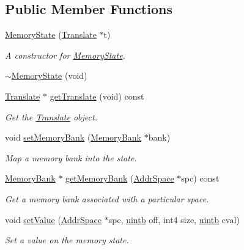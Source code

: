 \subsection*{Public Member Functions}
\begin{DoxyCompactItemize}
\item 
\mbox{\hyperlink{class_memory_state_a99b4d8fc22d89ffdcaaef799ffaf7909}{Memory\+State}} (\mbox{\hyperlink{class_translate}{Translate}} $\ast$t)
\begin{DoxyCompactList}\small\item\em A constructor for \mbox{\hyperlink{class_memory_state}{Memory\+State}}. \end{DoxyCompactList}\item 
\mbox{\hyperlink{class_memory_state_abaeb9c50eb22aa5110edb57461be41c3}{$\sim$\+Memory\+State}} (void)
\item 
\mbox{\hyperlink{class_translate}{Translate}} $\ast$ \mbox{\hyperlink{class_memory_state_aefbe63d695c36756cbc16d09bea76677}{get\+Translate}} (void) const
\begin{DoxyCompactList}\small\item\em Get the \mbox{\hyperlink{class_translate}{Translate}} object. \end{DoxyCompactList}\item 
void \mbox{\hyperlink{class_memory_state_ad1c31dbc7de2dfb6926537c7f9166e92}{set\+Memory\+Bank}} (\mbox{\hyperlink{class_memory_bank}{Memory\+Bank}} $\ast$bank)
\begin{DoxyCompactList}\small\item\em Map a memory bank into the state. \end{DoxyCompactList}\item 
\mbox{\hyperlink{class_memory_bank}{Memory\+Bank}} $\ast$ \mbox{\hyperlink{class_memory_state_abf51909f3b3b47db085f754680445b62}{get\+Memory\+Bank}} (\mbox{\hyperlink{class_addr_space}{Addr\+Space}} $\ast$spc) const
\begin{DoxyCompactList}\small\item\em Get a memory bank associated with a particular space. \end{DoxyCompactList}\item 
void \mbox{\hyperlink{class_memory_state_af4abdf013cacfaa4cfbe223f3893a76a}{set\+Value}} (\mbox{\hyperlink{class_addr_space}{Addr\+Space}} $\ast$spc, \mbox{\hyperlink{types_8h_a2db313c5d32a12b01d26ac9b3bca178f}{uintb}} off, int4 size, \mbox{\hyperlink{types_8h_a2db313c5d32a12b01d26ac9b3bca178f}{uintb}} cval)
\begin{DoxyCompactList}\small\item\em Set a value on the memory state. \end{DoxyCompactList}\item 

\end{DoxyCompactItemize}
